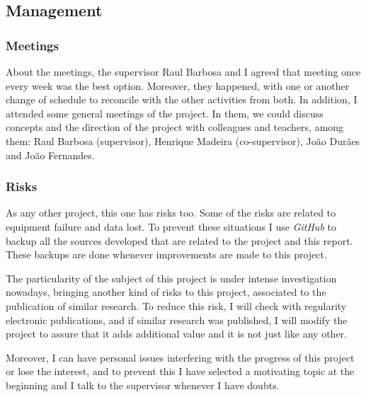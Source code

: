 \subsection{Management}

\subsubsection{Meetings}

About the meetings, the supervisor Raul Barbosa and I agreed that meeting once every week was the best option. Moreover, they happened, with one or another change of schedule to reconcile with the other activities from both. In addition, I attended some general meetings of the project. In them, we could discuss concepts and the direction of the project with colleagues and teachers, among them: Raul Barbosa (supervisor), Henrique Madeira (co-supervisor), João Durães and João Fernandes.

\subsubsection{Risks}

As any other project, this one has risks too.
Some of the risks are related to equipment failure and data lost. To prevent these situations I use \textit{GitHub} to backup all the sources developed that are related to the project and this report. These backups are done whenever improvements are made to this project.

The particularity of the subject of this project is under intense investigation nowadays, bringing another kind of risks to this project, associated to the publication of similar research. To reduce this risk, I will check with regularity electronic publications, and if similar research was published, I will modify the project to assure that it adds additional value and it is not just like any other.

Moreover, I can have personal issues interfering with the progress of this project or lose the interest, and to prevent this I have selected a motivating topic at the beginning and I talk to the supervisor whenever I have doubts.

